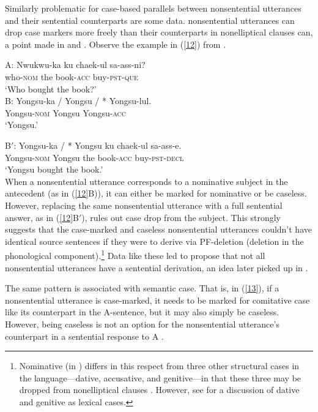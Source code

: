 Similarly problematic for case-based parallels between nonsentential utterances and their sentential
counterparts are some  data.  nonsentential utterances can drop case markers
more freely than their counterparts in nonelliptical clauses can, a point made in \citet{Morgan1989}
and \citet{Kim2015}. Observe the example in (\ref{12}) from \citet[237]{Morgan1989}.

\ea
A: \gll Nwukwu-ka        ku  chaek-ul          sa-ass-ni?\\
        who-\textsc{nom} the book-\textsc{acc} buy-\textsc{pst}-\textsc{que}\\
\glt  \hphantom{A:~}`Who bought the book?'\\

B: \gll Yongsu-ka / Yongsu / * Yongsu-lul.\\
        Yongsu-\textsc{nom} {} Yongsu {} {} Yongsu-\textsc{acc}\\
\glt  \hphantom{B:~}`Yongsu.'

B$'$: \gll Yongsu-ka            /  *  Yongsu ku  chaek-ul          sa-ass-e.\\
           Yongsu-\textsc{nom}  {} {} Yongsu the book-\textsc{acc} buy-\textsc{pst}-\textsc{decl}\\
\glt  \hphantom{B$'$:~}`Yongsu bought the book.'\\
\label{12}
\z
%
When a nonsentential utterance  corresponds to a nominative subject in the antecedent (as in (\ref{12}B)), it can either be marked for nominative or be caseless.
However, replacing the same nonsentential utterance  with a full sentential answer, as in (\ref{12}B$'$), rules out case drop from the subject. This strongly suggests that the case-marked and caseless nonsentential utterances couldn't have identical source sentences if they were to derive via PF-deletion (deletion in the phonological component).\footnote{Nominative (in ) differs in this respect from three other structural cases in the language---dative, accusative, and genitive---in that these three may be dropped from nonelliptical clauses \citep[see][]{Morgan1989, Lee2016, Kim2016}. However, see \citet{Mueller2002b} for a discussion of  dative and genitive as lexical cases.}  Data like these led \citet{Morgan1989} to propose that not all nonsentential utterances have a sentential derivation, an idea later picked up in \citet{Barton1998}.

The same pattern is associated with semantic case. That is, in (\ref{13}), if a nonsentential
utterance is case-marked, it needs to be marked for comitative case like its counterpart in the
A-sentence, but it may also simply be caseless. However, being caseless is not an option for the
nonsentential utterance's counterpart in a sentential response to A \citep[280]{Kim2015}.


